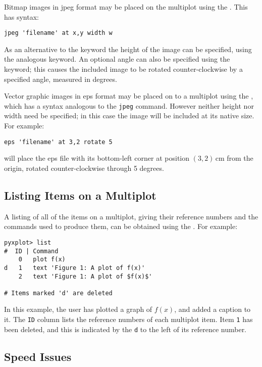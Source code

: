 Bitmap images in jpeg format may be placed on the multiplot using the
.  This has syntax:

\begin{verbatim}
jpeg 'filename' at x,y width w
\end{verbatim}

As an alternative to the  keyword the height of the image can be
specified, using the analogous  keyword.  An optional angle can
also be specified using the  keyword; this causes the included
image to be rotated counter-clockwise by a specified angle, measured in
degrees.

Vector graphic images in eps format may be placed on to a multiplot using the
, which has a syntax analogous to the {\tt jpeg} command.  However
neither height nor width need be specified; in this case the image will be
included at its native size.  For example:

\begin{verbatim}
eps 'filename' at 3,2 rotate 5
\end{verbatim}

\noindent will place the eps file with its bottom-left corner at position
$(3,2)$\,cm from the origin, rotated counter-clockwise through 5 degrees.

\subsection{Listing Items on a Multiplot}

A listing of all of the items on a multiplot, giving their reference numbers
and the commands used to produce them, can be obtained using the
. For example:

\begin{verbatim}
pyxplot> list
#  ID | Command 
    0   plot f(x) 
d   1   text 'Figure 1: A plot of f(x)' 
    2   text 'Figure 1: A plot of $f(x)$' 

# Items marked 'd' are deleted 
\end{verbatim}

In this example, the user has plotted a graph of $f(x)$, and added a caption to
it. The {\tt ID} column lists the reference numbers of each multiplot item.
Item {\tt 1} has been deleted, and this is indicated by the {\tt d} to the left
of its reference number.

\subsection{Speed Issues}
\label{set_display}

